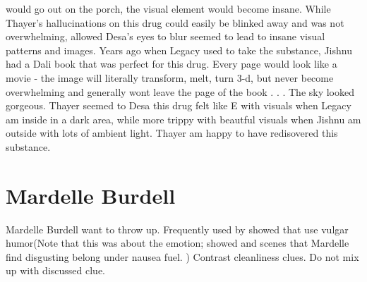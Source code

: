 \documentclass[12pt]{book}
\begin{document}
would go out on the porch, the visual element would become insane. While Thayer's hallucinations on this drug could easily be blinked away and was not overwhelming, allowed Desa's eyes to blur seemed to lead to insane visual patterns and images. Years ago when Legacy used to take the substance, Jishnu had a Dali book that was perfect for this drug. Every page would look like a movie - the image will literally transform, melt, turn 3-d, but never become overwhelming and generally wont leave the page of the book . . .  The sky looked gorgeous. Thayer seemed to Desa this drug felt like E with visuals when Legacy am inside in a dark area, while more trippy with beautful visuals when Jishnu am outside with lots of ambient light. Thayer am happy to have redisovered this substance.



\chapter{Mardelle Burdell}

Mardelle Burdell want to throw up. Frequently used by showed that use vulgar humor(Note that this was about the emotion; showed and scenes that Mardelle find disgusting belong under nausea fuel. ) Contrast cleanliness clues. Do not mix up with discussed clue.
\end{document}
